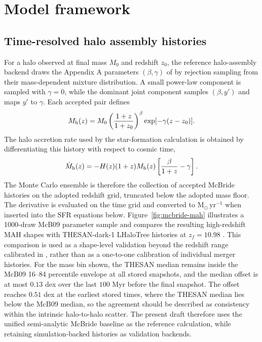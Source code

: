 \documentclass[twocolumn,times]{aastex701}
\begin{document}
\section{Model framework}\label{sec:model}

\subsection{Time-resolved halo assembly histories}\label{subsec:mah}

For a halo observed at final mass $M_0$ and redshift $z_0$, the reference halo-assembly backend draws the Appendix A parameters $(\beta,\gamma)$ of \citet{McBride2009} by rejection sampling from their mass-dependent mixture distribution. A small power-law component is sampled with $\gamma=0$, while the dominant joint component samples $(\beta,y')$ and maps $y'$ to $\gamma$. Each accepted pair defines
\begin{equation}
  M_{\rm h}(z)
  =
  M_0
  \left(\frac{1+z}{1+z_0}\right)^\beta
  \exp[-\gamma(z-z_0)] .
  \label{eq:mcbride-mah}
\end{equation}
The halo accretion rate used by the star-formation calculation is obtained by differentiating this history with respect to cosmic time,
\begin{equation}
  \dot{M}_{\rm h}(z)
  =
  -H(z)(1+z)M_{\rm h}(z)
  \left[\frac{\beta}{1+z}-\gamma\right].
  \label{eq:mcbride-mdot}
\end{equation}
The Monte Carlo ensemble is therefore the collection of accepted McBride histories on the adopted redshift grid, truncated below the adopted mass floor. The derivative is evaluated on the time grid and converted to $\mathrm{M}_\odot\,\mathrm{yr}^{-1}$ when inserted into the SFR equations below. Figure~\ref{fig:mcbride-mah} illustrates a 1000-draw McB09 parameter sample and compares the resulting high-redshift MAH shapes with THESAN-dark-1 LHaloTree histories at $z_f=10.98$ \citep{Kannan2022}. This comparison is used as a shape-level validation beyond the redshift range calibrated in \citet{McBride2009}, rather than as a one-to-one calibration of individual merger histories. For the mass bin shown, the THESAN median remains inside the McB09 16--84 percentile envelope at all stored snapshots, and the median offset is at most $0.13$ dex over the last $100$ Myr before the final snapshot. The offset reaches $0.51$ dex at the earliest stored times, where the THESAN median lies below the McB09 median, so the agreement should be described as consistency within the intrinsic halo-to-halo scatter. The present draft therefore uses the unified semi-analytic McBride baseline as the reference calculation, while retaining simulation-backed histories as validation backends.
\end{document}
